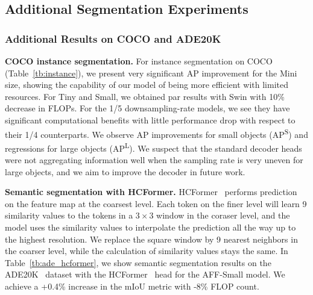 \documentclass[10pt,twocolumn,letterpaper]{article}
\begin{document}
\subsection{Additional Segmentation Experiments}

\subsubsection{Additional Results on COCO and ADE20K}



\textbf{COCO instance segmentation.} For instance segmentation on COCO (Table~\ref{tb:instance}), we present very significant AP improvement for  the Mini size, showing the capability of our model of being more efficient with limited resources. For Tiny and Small, we obtained par results with Swin with 10\% decrease in FLOPs. For the 1/5 downsampling-rate models, we see they have significant computational benefits with little performance drop with respect to their 1/4 counterparts. 
We observe AP improvements for small objects (AP\textsuperscript{S}) and regressions for large objects (AP\textsuperscript{L}). We suspect that the standard decoder heads were not aggregating information well when the sampling rate is very uneven for large objects, and we aim to improve the decoder in future work.

\textbf{Semantic segmentation with HCFormer.} HCFormer~\cite{hcformer} performs prediction on the feature map at the coarsest level. Each token on the finer level will learn 9 similarity values to the tokens in a $3\times 3$ window in the coraser level, and the model uses the similarity values to interpolate the prediction all the way up to the highest resolution. We replace the square window by 9 nearest neighbors in the coarser level, while the calculation of similarity values stays the same. 
In Table~\ref{tb:ade_hcformer}, we show semantic segmentation results on the ADE20K~\cite{ade} dataset with the HCFormer~\cite{hcformer} head for the AFF-Small model. We achieve a +0.4\% increase in the mIoU metric with -8\% FLOP count.
\end{document}
